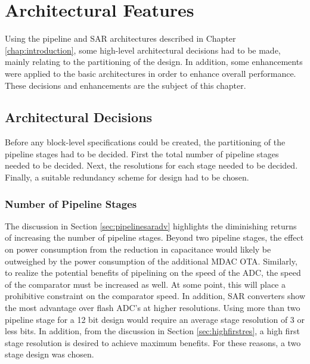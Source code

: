 \chapter{Architectural Features}
Using the pipeline and SAR architectures described in Chapter \ref{chap:introduction}, some high-level architectural decisions had to be made, mainly relating to the partitioning of the design. In addition, some enhancements were applied to the basic architectures in order to enhance overall performance. These decisions and enhancements are the subject of this chapter.
\section{Architectural Decisions}
Before any block-level specifications could be created, the partitioning of the pipeline stages had to be decided. First the total number of pipeline stages needed to be decided. Next, the resolutions for each stage needed to be decided. Finally, a suitable redundancy scheme for design had to be chosen.
\subsection{Number of Pipeline Stages}
The discussion in Section \ref{sec:pipelinesaradv} highlights the diminishing returns of increasing the number of pipeline stages. Beyond two pipeline stages, the effect on power consumption from the reduction in capacitance 
would likely be outweighed by the power consumption of the additional MDAC OTA. Similarly, to realize the potential benefits of pipelining on the speed of the ADC, the speed of the comparator must be increased as well. At 
some point, this will place a prohibitive constraint on the comparator speed. In addition, SAR converters show the most advantage over flash ADC's at higher resolutions. Using more than two pipeline stage for a 12 bit design 
would require an average stage resolution of 3 or less bits. In addition, from the discussion in Section \ref{sec:highfirstres}, a high first stage resolution is desired to achieve maximum benefits. For these reasons, a two 
stage design was chosen.
